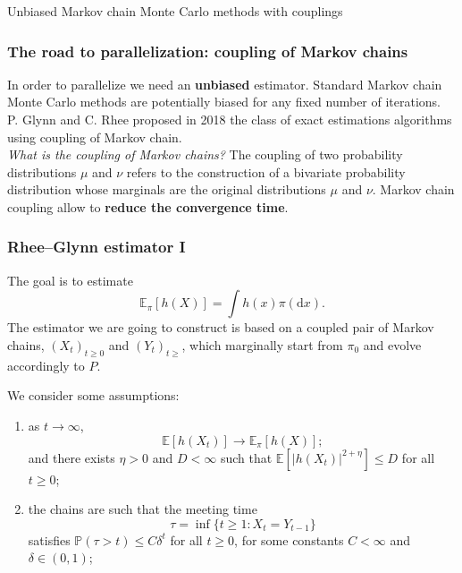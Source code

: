 \documentclass{beamer}
\begin{document}
\begin{section}{Unbiased Markov chain Monte Carlo methods with couplings}
	\begin{frame}[plain]{}
		\sectionpage
	\end{frame}

	\begin{frame}
	 	\frametitle{The road to parallelization: coupling of Markov chains}
		In order to parallelize we need an \textbf{unbiased} estimator.
		\vspace{0.3 cm }
		Standard Markov chain Monte Carlo methods are potentially biased for any fixed number of iterations.\\
		\vspace{0.3 cm }
		P. Glynn and C. Rhee proposed in 2018 the class of exact estimations algorithms using coupling of Markov chain.\\
		\vspace{0.3 cm }
		\pause
 		\textit{What is the coupling of Markov chains?}
 		The coupling of two probability distributions $\mu$ and $\nu$ refers to the construction of a bivariate probability distribution whose marginals are the original distributions $\mu$ and $\nu$.
 		\vspace{0.3 cm }
 		Markov chain coupling allow to \textbf{reduce the convergence time}.
	\end{frame}

	\begin{frame}
	 	\frametitle{Rhee--Glynn estimator I}
	 	The goal is to estimate
	 	$$
	 	\mathbb{E}_{\pi}[h(X)] 
	 	= \int h(x) \pi (\text{d}x)
	 	.
	 	$$
	 	The estimator we are going to construct is based on a coupled pair of Markov chains, $(X_t)_{t\geq 0}$ and $(Y_t)_{t\geq}$, which marginally start from $\pi_0$ and evolve accordingly to $P$.\\ 
	\end{frame}
	
	\begin{frame}
	 	We consider some assumptions:
	 	\begin{enumerate}
	 		\item as $t \to \infty$, 
	 		$$ \mathbb E [h(X_t)] \to \mathbb E_\pi [h(X)];$$
	 		and there exists $\eta > 0$ and $D < \infty$ such that $\mathbb E [|h(X_t)|^{2 + \eta}] \leq D$ for all $t \geq 0$;
	 		
	 		\pause
	 		\item the chains are such that the meeting time 
	 		$$
	 			\tau 
	 			= \inf\{t \geq 1 : X_t = Y_{t-1}\}
	 		$$ 
	 		satisfies $\mathbb{P}(\tau > t) \leq C \delta^t$ for all $t \geq 0$, for some constants $C < \infty$ and $\delta \in (0,1)$;
	 		

\end{enumerate}
\end{frame}
\end{section}
\end{document}
